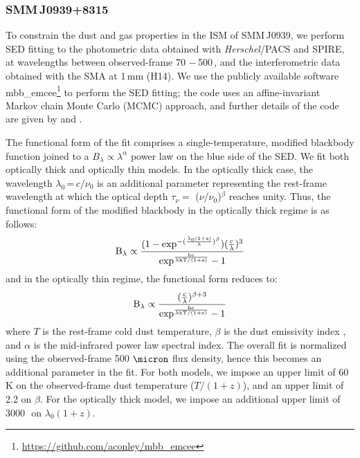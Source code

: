 \documentclass[iop, revtex4]{emulateapj}
\begin{document}
\subsubsection{SMM\,J0939+8315} \label{sec:SEDBg}
To constrain the dust and gas properties in the ISM of SMM\,J0939, we perform SED fitting to the
photometric data obtained with {\it Herschel}/PACS and SPIRE, at wavelengths
between observed-frame 70\,\micron\,$-$\,500\,\micron, and the interferometric data obtained with the SMA at 1\,mm (H14). We use the publicly
available software {\sc mbb\_emcee}\footnote{\url{https://github.com/aconley/mbb\_emcee}} to perform the SED fitting; the code uses an affine-invariant Markov chain Monte
Carlo (MCMC) approach, and further details of the code are given by \citet{Riechers13a} and \citet{Dowell14a}. \par
The
functional form of the fit comprises a single-temperature, modified blackbody function joined to a $B_{\lambda} \propto \lambda^\alpha
$ power law on the blue
side of the SED.
We fit both optically thick and optically thin models. In the optically thick case, the wavelength $
\lambda_0$\,=\,${c}/{\nu_0}$ is an additional parameter representing the rest-frame wavelength at which the optical
depth $\tau_{\nu} =$ ($\nu$/$\nu_0$)$^\beta$ reaches unity. Thus, the functional form of the modified blackbody
in the optically thick regime is as follows:
\begin{equation}
\rm B_{\lambda} \propto \frac{(1-exp^{-(\frac{\lambda_0 (1+z)}{\lambda})^{\beta}})(\frac{c}{\lambda})^3}
{exp^{\frac{hc}{\lambda\rm{kT/(1+z)} } }-1}
\end{equation}
and in the optically thin regime, the functional form reduces to:
\begin{equation}
\rm B_{\lambda} \propto \frac{(\frac{c}{\lambda})^{\beta+3}}{exp^{\frac{hc}{\lambda\rm{kT/(1+z)}}}-1}
\end{equation}
where $T$ is the rest-frame cold dust temperature, $\beta$ is the dust emissivity index 
, and $\alpha$ is the mid-infrared power law spectral index. The overall fit is normalized using the observed-frame 500
$\micron$ flux density, hence this becomes an additional parameter in the fit. For both models, we impose an upper limit of 60 K on the observed-frame dust temperature ($T/(1+z)$), and an upper limit of 2.2 on
$\beta$. For the optically thick model, we impose an additional upper limit of 3000\,\micron\ on $\lambda_0 (1+z)$.
\end{document}
